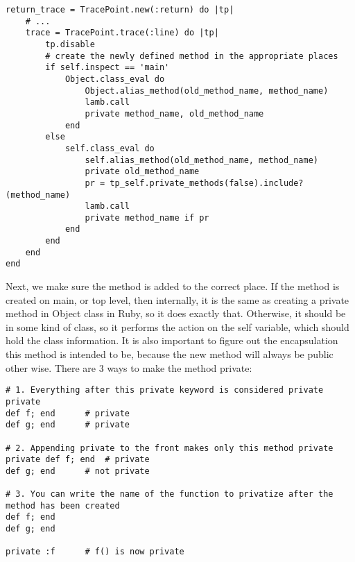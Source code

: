 \begin{lstlisting}[caption={Wrapper method: Add it to the correct place with the right scope}]
return_trace = TracePoint.new(:return) do |tp|
    # ...
    trace = TracePoint.trace(:line) do |tp|
        tp.disable
        # create the newly defined method in the appropriate places
        if self.inspect == 'main'
            Object.class_eval do
                Object.alias_method(old_method_name, method_name)
                lamb.call
                private method_name, old_method_name
            end
        else
            self.class_eval do
                self.alias_method(old_method_name, method_name)
                private old_method_name
                pr = tp_self.private_methods(false).include?(method_name)
                lamb.call
                private method_name if pr
            end
        end            
    end
end

\end{lstlisting}

Next, we make sure the method is added to the correct place.  If the method is created on main, or top level, then internally, it is the same as creating a private method in Object class in Ruby, so it does exactly that.  Otherwise, it should be in some kind of class, so it performs the action on the self variable, which should hold the class information.  It is also important to figure out the encapsulation this method is intended to be, because the new method will always be public other wise.  There are 3 ways to make the method private:

\begin{lstlisting}[caption={Private methods}]
# 1. Everything after this private keyword is considered private
private
def f; end 		# private
def g; end 		# private

# 2. Appending private to the front makes only this method private
private def f; end 	# private
def g; end		# not private

# 3. You can write the name of the function to privatize after the method has been created
def f; end
def g; end

private :f		# f() is now private
\end{lstlisting}


